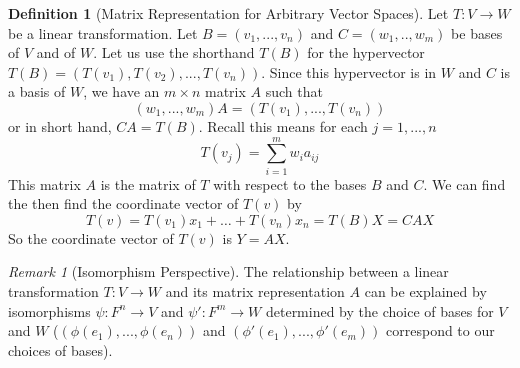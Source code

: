 \documentclass[12pt]{article}
\theoremstyle{definition}
\newtheorem{defn}[thm]{Definition}
\theoremstyle{remark}
\newtheorem{rmk}[thm]{Remark}
\numberwithin{equation}{section}
\begin{document}
\begin{defn}[Matrix Representation for Arbitrary Vector Spaces]
        Let $T:V\rightarrow W$ be a linear transformation. Let $B = (v_1,...,v_n)$ and $C = (w_1,..,w_m)$ be bases of $V$ and of $W$. Let us use the shorthand $T(B)$ for the hypervector $T(B) = (T(v_1),T(v_2),...,T(v_n))$. Since this hypervector is in $W$ and $C$ is a basis of $W$, we have an $m\times n$ matrix $A$ such that \begin{equation}
                (w_1,...,w_m)A = (T(v_1),...,T(v_n))
        \end{equation}
        or in short hand, $CA = T(B)$. Recall this means for each $j = 1,...,n$ \begin{equation}
                T(v_j) = \sum\limits_{i=1}^mw_ia_{ij}
        \end{equation}
        This matrix $A$ is the matrix of $T$ with respect to the bases $B$ and $C$. We can find the then find the coordinate vector of $T(v)$ by \begin{equation}
                T(v) = T(v_1)x_1+\hdots + T(v_n)x_n = T(B)X = CAX
        \end{equation}
        So the coordinate vector of $T(v)$ is $Y = AX$.
\end{defn}

\vspace{15pt}


\begin{rmk}[Isomorphism Perspective]
        The relationship between a linear transformation $T:V\rightarrow W$ and its matrix representation $A$ can be explained by isomorphisms $\psi : F^n \rightarrow V$ and $\psi': F^m \rightarrow W$ determined by the choice of bases for $V$ and $W$ ($(\phi(e_1),...,\phi(e_n))$ and $(\phi'(e_1),...,\phi'(e_m))$ correspond to our choices of bases).
\end{rmk}

\vspace{15pt}
\end{document}
